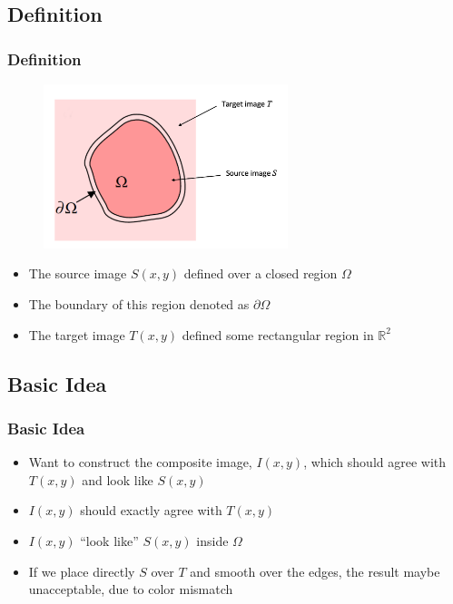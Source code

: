 \documentclass{beamer}
\begin{document}
\subsection{Definition} 
\begin{frame}
\frametitle{Definition} 
    \begin{figure}[!ht]
        \centering
        \includegraphics[width=2.8in]{resource/region.png}
    \end{figure}
    \begin{itemize}
        \item The source image $S(x,y)$ defined over a closed region $\Omega$
        \item The boundary of this region denoted as $\partial \Omega$
        \item The target image $T(x,y)$ defined some rectangular region in $\mathbb{R}^2$        
    \end{itemize}    
\end{frame}

\subsection{Basic Idea} 

\begin{frame}
\frametitle{Basic Idea}
\begin{itemize}   
    \item Want to construct the composite image, $I(x,y)$, which should agree with $T(x,y)$ and look like $S(x,y)$    
    \item $I(x,y)$ should exactly agree with $T(x,y)$ 
    \item $I(x,y)$ ``look like'' $S(x,y)$ inside $\Omega$
    \item If we place directly $S$ over $T$ and smooth over the edges, the result maybe unacceptable, due to color mismatch
    \end{itemize}
\end{frame}
\end{document}
